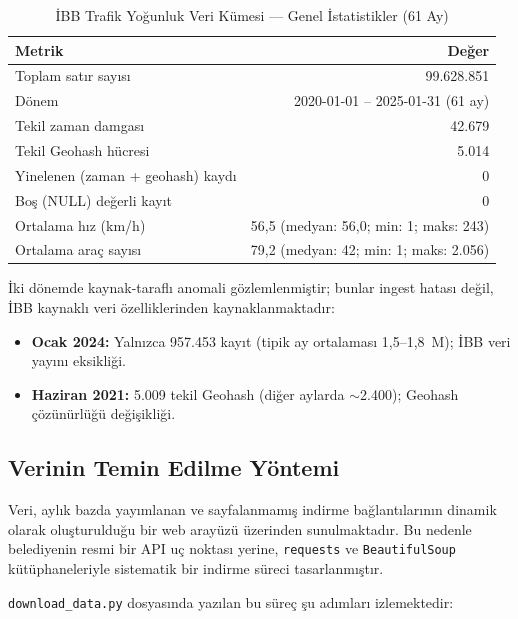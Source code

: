 \documentclass[12pt,a4paper]{article}
\begin{document}
\begin{table}[H]
\centering
\caption{İBB Trafik Yoğunluk Veri Kümesi — Genel İstatistikler (61 Ay)}
\label{tab:dataset-summary}
\begin{tabular}{l r}
\toprule
\textbf{Metrik} & \textbf{Değer} \\
\midrule
Toplam satır sayısı    & 99.628.851 \\
Dönem                  & 2020-01-01 -- 2025-01-31 (61 ay) \\
Tekil zaman damgası    & 42.679 \\
Tekil Geohash hücresi  & 5.014 \\
Yinelenen (zaman + geohash) kaydı & 0 \\
Boş (NULL) değerli kayıt & 0 \\
\midrule
Ortalama hız (km/h)    & 56,5 (medyan: 56,0; min: 1; maks: 243) \\
Ortalama araç sayısı   & 79,2 (medyan: 42; min: 1; maks: 2.056) \\
\bottomrule
\end{tabular}
\end{table}

\begin{notebox}
İki dönemde kaynak-taraflı anomali gözlemlenmiştir; bunlar ingest hatası değil, İBB kaynaklı veri özelliklerinden kaynaklanmaktadır:
\begin{itemize}
    \item \textbf{Ocak 2024:} Yalnızca 957.453 kayıt (tipik ay ortalaması 1,5--1,8~M); İBB veri yayını eksikliği.
    \item \textbf{Haziran 2021:} 5.009 tekil Geohash (diğer aylarda $\sim$2.400); Geohash çözünürlüğü değişikliği.
\end{itemize}
\end{notebox}

\subsection{Verinin Temin Edilme Yöntemi}

Veri, aylık bazda yayımlanan ve sayfalanmamış indirme bağlantılarının dinamik olarak oluşturulduğu bir web arayüzü üzerinden sunulmaktadır. Bu nedenle belediyenin resmi bir API uç noktası yerine, \texttt{requests} ve \texttt{BeautifulSoup} kütüphaneleriyle sistematik bir indirme süreci tasarlanmıştır.

\texttt{download\_data.py} dosyasında yazılan bu süreç şu adımları izlemektedir:
\end{document}
